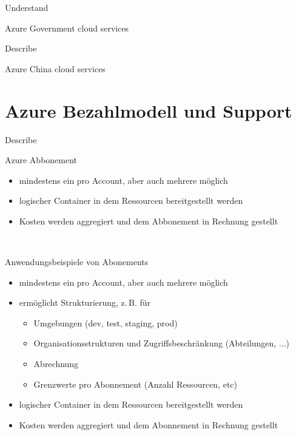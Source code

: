 \documentclass{scrartcl}
\newenvironment{flashcard}[2][]{%
    #1
    \vfill
    \centerline{\Large{#2}}
    \vfill
\newpage
}
{\newpage}
\newcommand{\sectioncard}[1]{
    \vspace*{\stretch{1}}
    \section{#1}
    \vspace*{\stretch{1}}
    \pagebreak
}
\begin{document}
    \begin{flashcard}[Understand]{Azure Government cloud services}

    \end{flashcard}

    \begin{flashcard}[Describe]{Azure China cloud services}

    \end{flashcard}

    \sectioncard{Azure Bezahlmodell und Support}

    \begin{flashcard}[Describe]{Azure Abbonement}
        \begin{itemize}
            \item mindestens ein pro Account, aber auch mehrere möglich
            \item logischer Container in dem Ressourcen bereitgestellt werden
            \item Kosten werden aggregiert und dem Abbonement in Rechnung gestellt
        \end{itemize}
    \end{flashcard}

    \begin{flashcard}[\ ]{Anwendungsbeispiele von Abonements}
        \begin{itemize}
            \item mindestens ein pro Account, aber auch mehrere möglich
            \item ermöglicht Strukturierung, z.\,B. für
            \begin{itemize}
                \item Umgebungen (dev, test, staging, prod)
                \item Organisationsstrukturen und Zugriffsbeschränkung (Abteilungen, ...)
                \item Abrechnung
                \item Grenzwerte pro Abonnement (Anzahl Ressourcen, etc)
            \end{itemize}
            \item logischer Container in dem Ressourcen bereitgestellt werden
            \item Kosten werden aggregiert und dem Abonnement in Rechnung gestellt
        \end{itemize}
    \end{flashcard}
\end{document}
